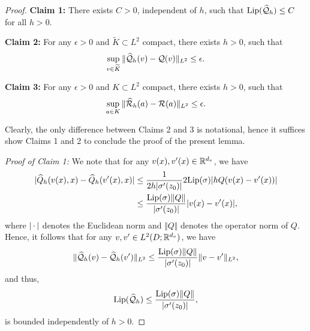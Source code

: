 \documentclass[reqno,a4paper]{amsart}
\begin{document}
\begin{proof}
\textbf{Claim 1:}
There exists $C>0$, independent of $h$, such that $\mathrm{Lip}(\widehat{\mathcal{Q}}_h) \le C$ for all $h>0$.

\textbf{Claim 2:}
For any $\epsilon > 0$ and $\tilde{K}\subset L^2$ compact, there exists $h>0$, such that 
\[
\sup_{v\in \widetilde{K}}\Vert \widehat{\mathcal{Q}}_h(v) - \mathcal{Q}(v) \Vert_{L^2} \le \epsilon.
\]

\textbf{Claim 3:}
For any $\epsilon > 0$ and $K\subset L^2$ compact, there exists $h>0$, such that 
\[
\sup_{a\in K}\Vert \widehat{\mathcal{R}}_h(a) - \mathcal{R}(a) \Vert_{L^2} \le \epsilon.
\]


Clearly, the only difference between Claims 2 and 3 is notational, hence it suffices show Claims 1 and 2 to conclude the proof of the present lemma.

\emph{Proof of Claim 1:}
We note that for any $v(x),v'(x)\in \mathbb{R}^{d_v}$, we have
\begin{align}
|\widehat{Q}_h(v(x),x) - \widehat{Q}_h(v'(x),x)|
&\le
\frac{1}{2h|\sigma'(z_0)|} 2\mathrm{Lip}(\sigma) |hQ(v(x) - v'(x))|
\\
&\le
\frac{\mathrm{Lip}(\sigma) \Vert Q \Vert}{|\sigma'(z_0)|} |v(x)-v'(x)|,
\end{align}
where $|{\,\cdot\,}|$ denotes the Euclidean norm and $\Vert Q \Vert$ denotes the operator norm of $Q$. Hence, it follows that for any $v,v'\in L^2(D;\mathbb{R}^{d_v})$, we have
\[
\Vert \widehat{\mathcal{Q}}_h(v) - \widehat{\mathcal{Q}}_h(v') \Vert_{L^2}
\le
\frac{\mathrm{Lip}(\sigma) \Vert Q \Vert}{|\sigma'(z_0)|} \Vert v - v'\Vert_{L^2},
\]
and thus,
\[
\mathrm{Lip}(\widehat{\mathcal{Q}}_h) \le \frac{\mathrm{Lip}(\sigma) \Vert Q \Vert}{|\sigma'(z_0)|},
\]
is bounded independently of $h>0$.


\end{proof}
\end{document}
